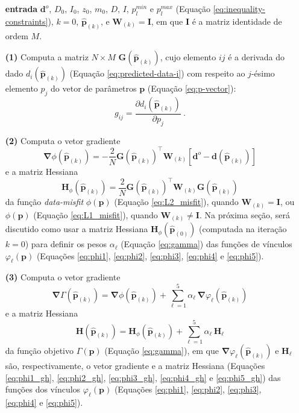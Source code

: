 \begin{itemize}
	\item[\textbf{entrada}] $\mathbf{d}^{o}$, $D_{0}$, $I_{0}$, $z_{0}$, 
	$m_{0}$, $D$, $I$, $p_{l}^{min}$ e $p_{l}^{max}$ (Equação 
	\ref{eq:inequality-constraints}), $k = 0$, $\hat{\mathbf{p}}_{(k)}$, e
	$\mathbf{W}_{(k)} = \mathbf{I}$, em que $\mathbf{I}$ é a matriz identidade de ordem $M$.
	\item[\textbf{(1)}] Computa a matriz $N \times M$ $\mathbf{G}(\hat{\mathbf{p}}_{(k)})$, cujo elemento $ij$ é a derivada do dado $d_{i}(\hat{\mathbf{p}}_{(k)})$ 
	(Equação \ref{eq:predicted-data-i}) com respeito ao $j$-ésimo elemento $p_{j}$ do vetor de parâme\-tros $\mathbf{p}$ (Equação \ref{eq:p-vector}):
	$$
	g_{ij} =  \dfrac{\partial d_{i}(\hat{\mathbf{p}}_{(k)})}{\partial{p_j}} \: .
	$$
	\item[\textbf{(2)}] Computa o vetor gradiente 
	$$
	\boldsymbol{\nabla} \phi(\hat{\mathbf{p}}_{(k)}) = 
	- \frac{2}{N} \mathbf{G}(\hat{\mathbf{p}}_{(k)})^{\top} 
	\mathbf{W}_{(k)} 
	\left[ \mathbf{d}^{o} - \mathbf{d}(\hat{\mathbf{p}}_{(k)}) \right]
	$$
	e a matriz Hessiana
	$$
	\mathbf{H}_{\phi}(\hat{\mathbf{p}}_{(k)}) = \frac{2}{N} 
	\mathbf{G}(\hat{\mathbf{p}}_{(k)})^{\top} \mathbf{W}_{(k)} 
	\mathbf{G}(\hat{\mathbf{p}}_{(k)})
	$$
	da função \textit{data-misfit} $\phi (\mathbf{p})$ (Equação \ref{eq:L2_misfit}),
	quando $\mathbf{W}_{(k)} = \mathbf{I}$, ou $\phi (\mathbf{p})$ 
	(Equação \ref{eq:L1_misfit}), quando $\mathbf{W}_{(k)} \ne \mathbf{I}$.
	Na próxima seção, será discutido como usar a matriz Hessiana 
	$\mathbf{H}_{\phi}(\hat{\mathbf{p}}_{(0)})$ (computada na iteração $k = 0$) 
	para definir os pesos $\alpha_{\ell}$ (Equação \ref{eq:gamma}) das funções de vínculos $\varphi_{\ell}(\mathbf{p})$ 
	(Equações \ref{eq:phi1}, \ref{eq:phi2}, \ref{eq:phi3}, \ref{eq:phi4} e \ref{eq:phi5}).
	\item[\textbf{(3)}] Computa o vetor gradiente 
	$$
	\boldsymbol{\nabla}\Gamma(\hat{\mathbf{p}}_{(k)}) = 
	\boldsymbol{\nabla}\phi (\hat{\mathbf{p}}_{(k)}) + 
	\sum\limits^{5}_{\ell =1} \alpha_{\ell} \, \boldsymbol{\nabla}\varphi_{\ell}(\hat{\mathbf{p}}_{(k)}) 
	$$ 
	e a matriz Hessiana
	$$
	\mathbf{H}(\hat{\mathbf{p}}_{(k)}) = 
	\mathbf{H}_\phi (\hat{\mathbf{p}}_{(k)}) + \sum\limits^{5}_{\ell =1} \alpha_{\ell} 
	\, \mathbf{H}_{\ell}
	$$ 
	da função objetivo $\Gamma (\mathbf{p})$ (Equação \ref{eq:gamma}),
	em que $\boldsymbol{\nabla}\varphi_{\ell}(\hat{\mathbf{p}}_{(k)})$ e
	$\mathbf{H}_{\ell}$ são, respectivamente, o vetor gradiente e a matriz Hessiana (Equações \ref{eq:phi1_gh}, \ref{eq:phi2_gh}, \ref{eq:phi3_gh}, \ref{eq:phi4_gh} e \ref{eq:phi5_gh}) das funções dos vínculos $\varphi_{\ell}(\mathbf{p})$ (Equações \ref{eq:phi1}, \ref{eq:phi2}, \ref{eq:phi3}, \ref{eq:phi4} e \ref{eq:phi5}).	

\end{itemize}
